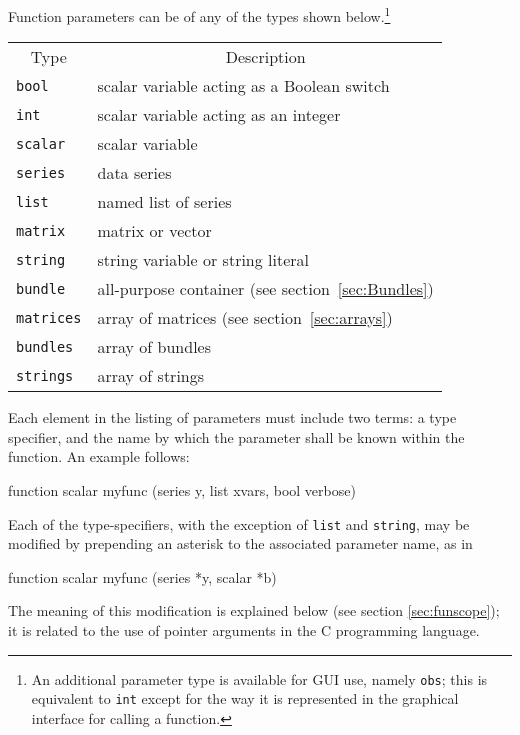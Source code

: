 Function parameters can be of any of the types shown
below.\footnote{An additional parameter type is available for GUI use,
  namely \texttt{obs}; this is equivalent to \texttt{int} except for
  the way it is represented in the graphical interface for calling a
  function.}

\begin{center}
\begin{tabular}{ll}
\multicolumn{1}{c}{Type} & 
\multicolumn{1}{c}{Description} \\ [4pt]
\texttt{bool}   & scalar variable acting as a Boolean switch \\
\texttt{int}    & scalar variable acting as an integer  \\
\texttt{scalar} & scalar variable \\
\texttt{series} & data series \\
\texttt{list}   & named list of series \\
\texttt{matrix} & matrix or vector \\
\texttt{string} & string variable or string literal \\
\texttt{bundle} & all-purpose container (see
                  section~\ref{sec:Bundles}) \\
\texttt{matrices} & array of matrices (see
                    section~\ref{sec:arrays}) \\
\texttt{bundles}  & array of bundles \\
\texttt{strings}  & array of strings
\end{tabular}
\end{center}

Each element in the listing of parameters must include two terms: a
type specifier, and the name by which the parameter shall be known
within the function.  An example follows:
%    
\begin{code}
function scalar myfunc (series y, list xvars, bool verbose)
\end{code}

Each of the type-specifiers, with the exception of \texttt{list} and
\texttt{string}, may be modified by prepending an asterisk to the
associated parameter name, as in
%    
\begin{code}
function scalar myfunc (series *y, scalar *b)
\end{code}

The meaning of this modification is explained below (see section
\ref{sec:funscope}); it is related to the use of pointer arguments in
the C programming language.

